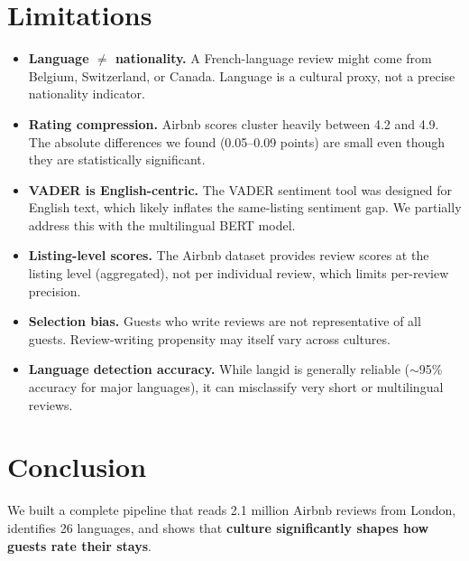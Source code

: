 \documentclass[12pt,a4paper]{article}
\begin{document}
\section{Limitations}

\begin{itemize}[nosep]
    \item \textbf{Language $\neq$ nationality.} A French-language review might come from Belgium, Switzerland, or Canada. Language is a cultural proxy, not a precise nationality indicator.
    \item \textbf{Rating compression.} Airbnb scores cluster heavily between 4.2 and 4.9. The absolute differences we found (0.05--0.09 points) are small even though they are statistically significant.
    \item \textbf{VADER is English-centric.} The VADER sentiment tool was designed for English text, which likely inflates the same-listing sentiment gap. We partially address this with the multilingual BERT model.
    \item \textbf{Listing-level scores.} The Airbnb dataset provides review scores at the listing level (aggregated), not per individual review, which limits per-review precision.
    \item \textbf{Selection bias.} Guests who write reviews are not representative of all guests. Review-writing propensity may itself vary across cultures.
    \item \textbf{Language detection accuracy.} While langid is generally reliable ($\sim$95\% accuracy for major languages), it can misclassify very short or multilingual reviews.
\end{itemize}

\section{Conclusion}

We built a complete pipeline that reads 2.1 million Airbnb reviews from London, identifies 26 languages, and shows that \textbf{culture significantly shapes how guests rate their stays}.
\end{document}
